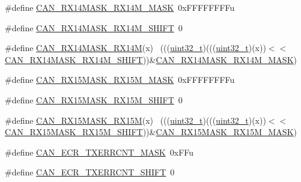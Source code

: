 \begin{DoxyCompactItemize}
\item 
\#define \hyperlink{group___c_a_n___register___masks_ga4687420a607d4279e24fa93f4b486ec3}{C\+A\+N\+\_\+\+R\+X14\+M\+A\+S\+K\+\_\+\+R\+X14\+M\+\_\+\+M\+A\+SK}~0x\+F\+F\+F\+F\+F\+F\+F\+Fu
\item 
\#define \hyperlink{group___c_a_n___register___masks_ga9e74b131e8180656fe9eb73191b73869}{C\+A\+N\+\_\+\+R\+X14\+M\+A\+S\+K\+\_\+\+R\+X14\+M\+\_\+\+S\+H\+I\+FT}~0
\item 
\#define \hyperlink{group___c_a_n___register___masks_gacbd7b6fc756ed286b025102797e7b562}{C\+A\+N\+\_\+\+R\+X14\+M\+A\+S\+K\+\_\+\+R\+X14M}(x)                                    ~(((\hyperlink{_p_e___types_8h_a33594304e786b158f3fb30289278f5af}{uint32\+\_\+t})(((\hyperlink{_p_e___types_8h_a33594304e786b158f3fb30289278f5af}{uint32\+\_\+t})(x))$<$$<$\hyperlink{group___c_a_n___register___masks_ga9e74b131e8180656fe9eb73191b73869}{C\+A\+N\+\_\+\+R\+X14\+M\+A\+S\+K\+\_\+\+R\+X14\+M\+\_\+\+S\+H\+I\+FT}))\&\hyperlink{group___c_a_n___register___masks_ga4687420a607d4279e24fa93f4b486ec3}{C\+A\+N\+\_\+\+R\+X14\+M\+A\+S\+K\+\_\+\+R\+X14\+M\+\_\+\+M\+A\+SK})
\item 
\#define \hyperlink{group___c_a_n___register___masks_gaf81f33076f662d5f4c737076e36e93b7}{C\+A\+N\+\_\+\+R\+X15\+M\+A\+S\+K\+\_\+\+R\+X15\+M\+\_\+\+M\+A\+SK}~0x\+F\+F\+F\+F\+F\+F\+F\+Fu
\item 
\#define \hyperlink{group___c_a_n___register___masks_ga1420efdd894578fe2a31563c25b58e59}{C\+A\+N\+\_\+\+R\+X15\+M\+A\+S\+K\+\_\+\+R\+X15\+M\+\_\+\+S\+H\+I\+FT}~0
\item 
\#define \hyperlink{group___c_a_n___register___masks_ga442945803e790f2d1173abcee249ae7e}{C\+A\+N\+\_\+\+R\+X15\+M\+A\+S\+K\+\_\+\+R\+X15M}(x)                                    ~(((\hyperlink{_p_e___types_8h_a33594304e786b158f3fb30289278f5af}{uint32\+\_\+t})(((\hyperlink{_p_e___types_8h_a33594304e786b158f3fb30289278f5af}{uint32\+\_\+t})(x))$<$$<$\hyperlink{group___c_a_n___register___masks_ga1420efdd894578fe2a31563c25b58e59}{C\+A\+N\+\_\+\+R\+X15\+M\+A\+S\+K\+\_\+\+R\+X15\+M\+\_\+\+S\+H\+I\+FT}))\&\hyperlink{group___c_a_n___register___masks_gaf81f33076f662d5f4c737076e36e93b7}{C\+A\+N\+\_\+\+R\+X15\+M\+A\+S\+K\+\_\+\+R\+X15\+M\+\_\+\+M\+A\+SK})
\item 
\#define \hyperlink{group___c_a_n___register___masks_gae4da1b026e86291036b8b7d7e78bffa7}{C\+A\+N\+\_\+\+E\+C\+R\+\_\+\+T\+X\+E\+R\+R\+C\+N\+T\+\_\+\+M\+A\+SK}~0x\+F\+Fu
\item 
\#define \hyperlink{group___c_a_n___register___masks_ga4f1e9e374563ef6c0502d1a441caf396}{C\+A\+N\+\_\+\+E\+C\+R\+\_\+\+T\+X\+E\+R\+R\+C\+N\+T\+\_\+\+S\+H\+I\+FT}~0

\end{DoxyCompactItemize}
